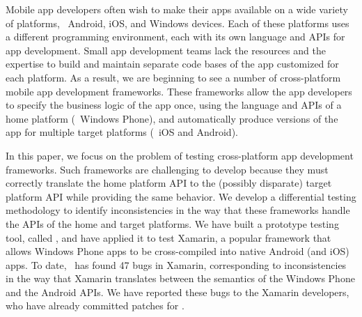 Mobile app developers often wish to make their apps available on a wide variety
of platforms, \eg~Android, iOS, and Windows devices. Each of these platforms
uses a different programming environment, each with its own language and APIs
for app development. Small app development teams lack the resources and the
expertise to build and maintain separate code bases of the app customized for
each platform. As a result, we are beginning to see a number of cross-platform
mobile app development frameworks. These frameworks allow the app developers to
specify the business logic of the app once, using the language and APIs of a
home platform (\eg~Windows Phone), and automatically produce versions of the
app for multiple target platforms (\eg~iOS and Android). 


In this paper, we focus on the problem of testing cross-platform app
development frameworks. Such frameworks are challenging to develop
because they must correctly translate the home platform API to the
(possibly disparate) target platform API while providing the same
behavior. We develop a differential testing methodology to identify
inconsistencies in the way that these frameworks handle the APIs of
the home and target platforms.  We have built a prototype testing
tool, called \tool, and have applied it to test Xamarin, a popular
framework that allows Windows Phone apps to be cross-compiled into
native Android (and iOS) apps.  To date, \tool\ has found 47 bugs in
Xamarin, corresponding to inconsistencies in the way that Xamarin
translates between the semantics of the Windows Phone and the Android
APIs. We have reported these bugs to the Xamarin developers, who have
already committed patches for .
